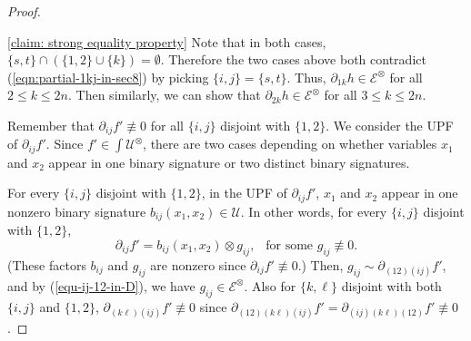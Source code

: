 \begin{proof}
\begin{claimproof}{\cref{claim: strong equality property}}
   Note that in both cases, $\{s,t\} \cap (\{1,2\} \cup \{k\}) = \emptyset$. Therefore
   the two cases above both contradict
   (\ref{eqn:partial-1kj-in-sec8}) by picking $\{i, j\}=\{s, t\}$.
      Thus, ${\partial}_{1k}{h}\in {\mathcal{E}}^{\otimes}$ for all $2 \leqslant k \leqslant 2n$. Then similarly, we can show that ${\partial}_{2k}{h}\in {\mathcal{E}}^{\otimes}$ for all $3 \leqslant k \leqslant 2n$. 
\end{claimproof}

Remember that ${\partial}_{ij}{f'}\not\equiv 0$ for all $\{i, j\}$ disjoint with $\{1, 2\}$.
We consider the UPF of ${\partial}_{ij}{f'}$. Since ${f'}\in {\int}{\mathcal{U}}^{\otimes}$, there are two cases depending on whether variables $x_1$ and $x_2$ appear in one  binary signature or two distinct binary signatures.

\vspace{1ex}
    For every $\{i, j\}$ disjoint with $\{1, 2\}$, in the UPF of ${\partial}_{ij}{f'}$, $x_1$ and $x_2$ appear in one nonzero binary signature
    ${b_{ij}}(x_1, x_2) \in {\mathcal{U}}$.  %
    In other words, for every $\{i, j\}$ disjoint with $\{1, 2\}$, $${\partial}_{ij}{f'}={b_{ij}}(x_1, x_2)\otimes {g_{ij}}, ~~\text{ for some } {g_{ij}}\not\equiv 0.$$
    (These factors ${b_{ij}}$ and $ {g_{ij}}$ are nonzero since ${\partial}_{ij}{f'}\not\equiv 0$.)
  Then, ${g_{ij}} \sim {\partial}_{(12)(ij)}{f'}$, and by
    (\ref{equ-ij-12-in-D}), we have ${g_{ij}}\in{\mathcal{E}}^{\otimes}$. 
    Also for $\{k, \ell\}$ disjoint with both $\{i, j\}$
    and $\{1, 2\}$, ${\partial}_{(k\ell)(ij)}{f'}
    \not \equiv 0$ since
    ${\partial}_{(12)(k \ell)(ij)} {f'} = {\partial}_{(ij)(k \ell)(12)} {f'} 
    \not \equiv 0$.
    

\end{proof}

